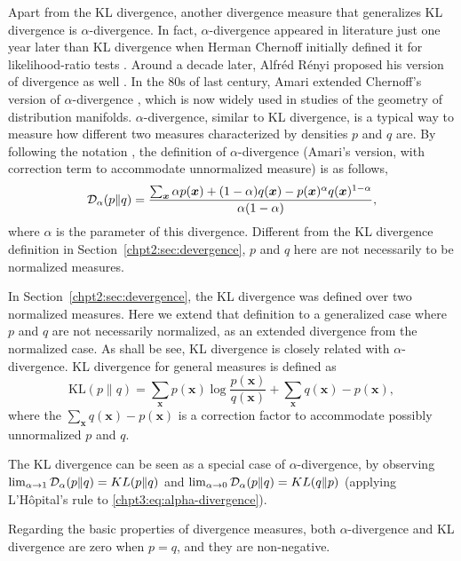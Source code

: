 Apart from the KL divergence, another divergence measure that generalizes KL divergence is $\alpha$-divergence. In fact, $\alpha$-divergence appeared in literature just one year later than KL divergence when Herman Chernoff initially defined it for likelihood-ratio tests \cite{Chernoff1952measure}. Around a decade later, Alfr\'ed R\'enyi proposed his version of divergence as well \cite{renyi1961entropy}. In the 80s of last century, Amari extended Chernoff's version of $\alpha$-divergence \cite{amari1982differential}, which is now widely used in studies of the geometry of distribution manifolds. 
$\alpha$-divergence, similar to KL divergence, is a typical way to measure how different two measures characterized by densities $p$ and $q$ are. By following the notation \cite{Zhu95informationgeometric}, the definition of $\alpha$-divergence (Amari's version, with correction term to accommodate unnormalized measure) is as follows,
\begin{equation}\label{chpt3:eq:alpha-divergence}
  \mathcal{D}_{\alpha}(p \| q ) = \frac{\sum_{\bm{x}} \alpha p(\bm{x}) + (1-\alpha) q (\bm{x}) - p(\bm{x})^{\alpha} q(\bm{x})^{1-\alpha}}{\alpha(1-\alpha)},
\end{equation}
where $\alpha$ is the parameter of this divergence. Different from the KL divergence definition in Section~\ref{chpt2:sec:devergence}, $p$ and $q$ here are not necessarily to be normalized measures.

In Section~\ref{chpt2:sec:devergence}, the KL divergence was defined over two normalized measures. Here we extend that definition to a generalized case where $p$ and $q$ are not necessarily normalized, as an extended divergence from the normalized case. As shall be see, KL divergence is closely related with $\alpha$-divergence. KL divergence for general measures is defined as
\begin{equation}\label{chpt3:eq:kl-divergence}
  \mathrm{KL}(p \| q) = \sum_{\bm{x}} p(\bm{x}) \log{\frac{p(\bm{x})}{q(\bm{x})}} + \sum_{\bm{x}} q(\bm{x}) - p(\bm{x}) ,
\end{equation}
where the $\sum_{\bm{x}} q(\bm{x}) - p(\bm{x})$ is a correction factor to accommodate possibly unnormalized $p$ and $q$.
\begin{remark}
  The KL divergence can be seen as a special case of $\alpha$-divergence, by observing $\lim_{\alpha \rightarrow 1}\mathcal{D}_{\alpha}(p \| q ) = KL(p\|q)$ and $\lim_{\alpha \rightarrow 0}\mathcal{D}_{\alpha}(p \| q ) = KL(q\|p)$ (applying L'H\^opital's rule to \eqref{chpt3:eq:alpha-divergence}).

  Regarding the basic properties of divergence measures, both $\alpha$-divergence and KL divergence are zero when $p=q$, and they are non-negative. 
\end{remark}

